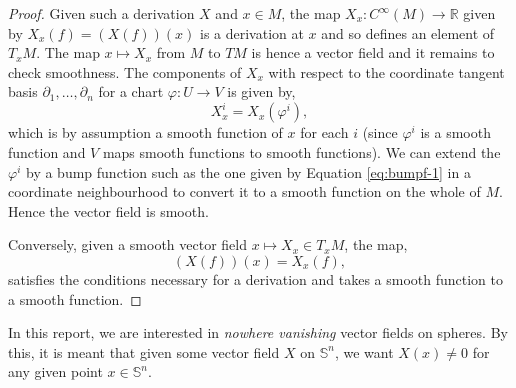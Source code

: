 \begin{proof}
Given such a derivation $X$ and $x\in M$, the map $X_x:C^{\infty}(M)\to\mathbb{R}$ given by $X_x(f)=(X(f))(x)$ is a derivation at $x$ and so defines an element of $T_xM$. The map $x\mapsto X_x$ from $M$ to $TM$ is hence a vector field and it remains to check smoothness. The components of $X_x$ with respect to the coordinate tangent basis $\partial_1,\ldots,\partial_n$ for a chart $\varphi:U\to V$ is given by,
\[
X_x^i=X_x(\varphi^i),
\]
which is by assumption a smooth function of $x$ for each $i$ (since $\varphi^i$ is a smooth function and $V$ maps smooth functions to smooth functions). We can extend the $\varphi^i$ by a bump function such as the one given by Equation \eqref{eq:bumpf-1} in a coordinate neighbourhood to convert it to a smooth function on the whole of $M$. Hence the vector field is smooth.

Conversely, given a smooth vector field $x\mapsto X_x\in T_xM$, the map,
\[
(X(f))(x)=X_x(f),
\] 
satisfies the conditions necessary for a derivation and takes a smooth function to a smooth function.
%
\end{proof}
\begin{remark}
In this report, we are interested in \textit{nowhere vanishing} vector fields on spheres. By this, it is meant that given some vector field $X$ on $\mathbb{S}^n$, we want $X(x)\neq 0$ for any given point $x\in\mathbb{S}^n$.
\end{remark}
